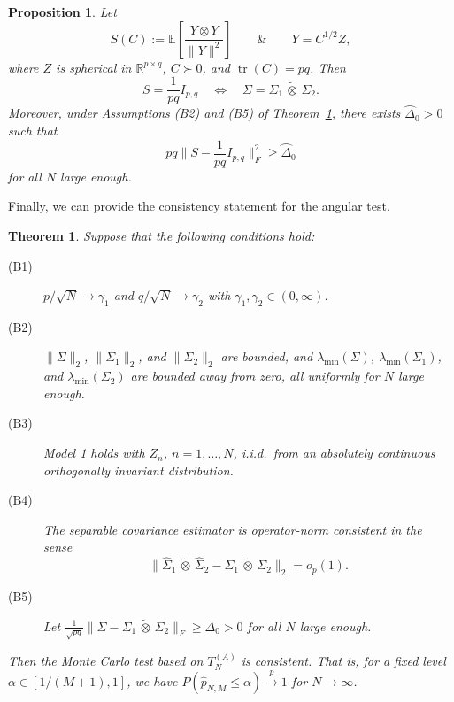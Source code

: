 \documentclass[12pt]{article}
\newcommand{\E}{\mathbb{E}}
\newcommand{\R}{\mathbb{R}}
\newcommand{\tr}{\operatorname{tr}}
\newcommand{\ot}{\,\tilde\otimes\,}
\newtheorem{theorem}{Theorem}
\newtheorem{proposition}{Proposition}
\begin{document}
\begin{proposition}\label{prop:relevant_hypothesis}
    Let
	\[
	S(C):=\E\!\left[\frac{Y \otimes Y}{\|Y\|^2}\right] \qquad \&
	\qquad
	Y=C^{1/2}Z,
	\]
	where $Z$ is spherical in \(\R^{p \times q}\), $C\succ0$, and $\tr(C)=pq$.
	Then
	\[
	S=\frac{1}{pq} I_{p,q}
	\quad\Leftrightarrow\quad
	\Sigma=\Sigma_1 \ot \Sigma_2.
	\]
	Moreover, under Assumptions (B2) and (B5) of Theorem~\ref{thm:angular_consistency}, there exists
	$\wideparen{\Delta}_0>0$ such that
	\[
	pq\Big\|S-\frac{1}{pq}I_{p,q}\Big\|_F^2
	\ge \wideparen{\Delta}_0
	\]
	for all $N$ large enough.
\end{proposition}

Finally, we can provide the consistency statement for the angular test.

\begin{theorem}\label{thm:angular_consistency}
    Suppose that the following conditions hold:
    \begin{description}
    \item[(B1)] \(p/\sqrt N\to \gamma_1\) and \(q/\sqrt N\to \gamma_2\) with
	\(\gamma_1,\gamma_2\in(0,\infty)\).
	\item[(B2)] \(\|\Sigma\|_{2}\), \(\|\Sigma_{1}\|_{2}\), and
	\(\|\Sigma_{2}\|_{2}\) are bounded, and
	\(\lambda_{\min}(\Sigma)\), \(\lambda_{\min}(\Sigma_{1})\), and
	\(\lambda_{\min}(\Sigma_{2})\) are bounded away from zero, all uniformly for
	\(N\) large enough.
	\item[(B3)] Model 1 holds with $Z_n$, $n=1,\dots,N$, i.i.d.~from an absolutely continuous orthogonally invariant distribution.
	\item[(B4)] The separable covariance estimator is operator-norm consistent in the sense
	\[
	\|\widehat\Sigma_{1}\ot \widehat\Sigma_{2} -\Sigma_{1}\ot \Sigma_{2}\|_{2}
	=o_p(1).
	\]
	\item[(B5)] Let $\frac{1}{\sqrt{pq}}
	\|\Sigma-\Sigma_{1}\ot \Sigma_{2}\|_F
	\ge \Delta_0 > 0 $
	for all $N$ large enough.
    \end{description}
    Then the Monte Carlo test based on $T_N^{(A)}$ is consistent. That is, for a fixed level $\alpha \in [1/(M+1), 1]$, we have $P(\widehat{p}_{N,M} \leq \alpha) \stackrel{p}{\to} 1$ for $N \to \infty$. 
\end{theorem}
\end{document}

